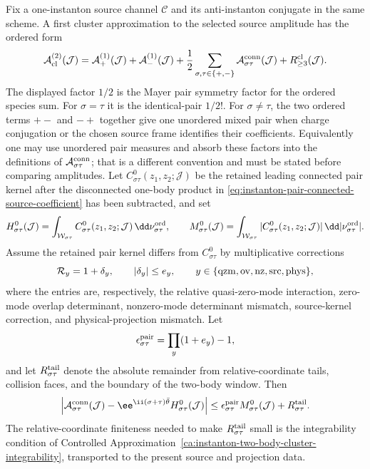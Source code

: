 \begin{controlledapproximation}
\label{ca:instanton-first-cluster-amplitude-correction}
Fix a one-instanton source channel \(\mathcal C\) and its anti-instanton
conjugate in the same scheme.  A first cluster approximation to the selected
source amplitude has the ordered form
\begin{equation}
  \mathcal A_{\rm cl}^{(2)}(\mathcal J)
  =
  \mathcal A_+^{(1)}(\mathcal J)
  +\mathcal A_-^{(1)}(\mathcal J)
  +\frac12\sum_{\sigma,\tau\in\{+,-\}}
    \mathcal A_{\sigma\tau}^{\rm conn}(\mathcal J)
  +R_{\ge3}^{\rm cl}(\mathcal J).
  \label{eq:instanton-source-first-cluster-assembly}
\end{equation}
The displayed factor \(1/2\) is the Mayer pair symmetry factor for the
ordered species sum.  For \(\sigma=\tau\) it is the identical-pair \(1/2!\).
For \(\sigma\ne\tau\), the two ordered terms \(+-\) and \(-+\) together give
one unordered mixed pair when charge conjugation or the chosen source frame
identifies their coefficients.  Equivalently one may use unordered pair
measures and absorb these factors into the definitions of
\(\mathcal A_{\sigma\tau}^{\rm conn}\); that is a different convention and
must be stated before comparing amplitudes.
Let \(C_{\sigma\tau}^{0}(z_1,z_2;\mathcal J)\) be the retained leading
connected pair kernel after the disconnected one-body product in
\eqref{eq:instanton-pair-connected-source-coefficient} has been subtracted,
and set
\[
  H_{\sigma\tau}^{0}(\mathcal J)
  =
  \int_{\mathcal W_{\sigma\tau}}
  C_{\sigma\tau}^{0}(z_1,z_2;\mathcal J)\,
  \dd\nu_{\sigma\tau}^{\rm ord},
  \qquad
  M_{\sigma\tau}^{0}(\mathcal J)
  =
  \int_{\mathcal W_{\sigma\tau}}
  |C_{\sigma\tau}^{0}(z_1,z_2;\mathcal J)|\,
  \dd|\nu_{\sigma\tau}^{\rm ord}|.
\]
Assume the retained pair kernel differs from \(C_{\sigma\tau}^{0}\) by
multiplicative corrections
\[
  \mathcal R_y=1+\delta_y,\qquad |\delta_y|\le e_y,
  \qquad
  y\in\{{\rm qzm},{\rm ov},{\rm nz},{\rm src},{\rm phys}\},
\]
where the entries are, respectively, the relative quasi-zero-mode
interaction, zero-mode overlap determinant, nonzero-mode determinant mismatch,
source-kernel correction, and physical-projection mismatch.  Let
\[
  \epsilon_{\sigma\tau}^{\rm pair}
  =
  \prod_y(1+e_y)-1,
\]
and let \(R_{\sigma\tau}^{\rm tail}\) denote the absolute remainder from
relative-coordinate tails, collision faces, and the boundary of the two-body
window.  Then
\begin{equation}
  \left|
  \mathcal A_{\sigma\tau}^{\rm conn}(\mathcal J)
  -
  \ee^{\ii(\sigma+\tau)\bar\theta}
  H_{\sigma\tau}^{0}(\mathcal J)
  \right|
  \le
  \epsilon_{\sigma\tau}^{\rm pair}
  M_{\sigma\tau}^{0}(\mathcal J)
  +R_{\sigma\tau}^{\rm tail}.
  \label{eq:instanton-source-first-cluster-bound}
\end{equation}
The relative-coordinate finiteness needed to make
\(R_{\sigma\tau}^{\rm tail}\) small is the integrability condition of
Controlled Approximation~\ref{ca:instanton-two-body-cluster-integrability},
transported to the present source and projection data.


\end{controlledapproximation}
